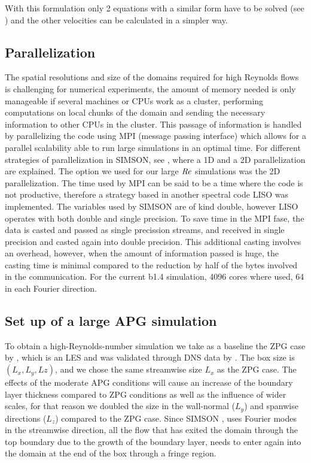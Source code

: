 With this formulation only 2 equations with a similar form have to be solved (see \cite{simson_techrep}) and the other velocities can be calculated in a simpler way.


\subsection{Parallelization}
The spatial resolutions and size of the domains required for high Reynolds flows is challenging for numerical experiments, the amount of memory needed is only manageable if several machines or CPUs work as a cluster, performing computations on local chunks of the domain and sending the necessary information to other CPUs in the cluster. 
This passage of information is handled by parallelizing the code using  MPI (message passing interface) which allows for a parallel scalability able to run large simulations in an optimal time.
For different strategies of parallelization in SIMSON, see \cite{MPI_SIMSON_Qiang}, where a 1D and a 2D parallelization are explained. 
The option we used for our large $\mbox{\textit{Re}}$ simulations was the 2D parallelization.
The time used by MPI can be said to be a time where the code is not productive, therefore a strategy based in another spectral code LISO \citep{Liso_Hoyas_PRL_2006} was implemented. The variables used by SIMSON are of kind double, however LISO operates with both double and single precision. To save time in the MPI fase, the data is casted and passed as single precission streams, and received in single precision and casted again into double precision.
This additional casting involves an overhead, however, when the amount of information passed is huge, the casting time is minimal compared to the reduction by half of the bytes involved in the communication.
For the current b1.4 simulation, 4096 cores where used, 64 in each Fourier direction.



\subsection{Set up of a large APG simulation}

To obtain a high-Reynolds-number simulation we take as a baseline the ZPG case by \cite{E-AmorZPG}, which is an LES and was validated through DNS data by \cite{schlatter_orlu_2010}.
The box size is $(L_x, L_y , Lz)$, and we chose the same streamwise size $L_x$ as the ZPG case. The effects of the moderate APG conditions will cause an increase of the boundary layer thickness compared to ZPG conditions as well as the influence of wider scales, for that reason we doubled the size in the wall-normal ($L_y$) and spanwise directions ($L_z$) compared to the ZPG case. 
\highlight{\ref{tab:param}}
Since SIMSON \citep{simson_techrep}, uses Fourier modes in the streamwise direction, all the flow that has exited the domain through the top boundary due to the growth of the boundary layer, needs to enter again into the domain at the end of the box through a fringe region. 


